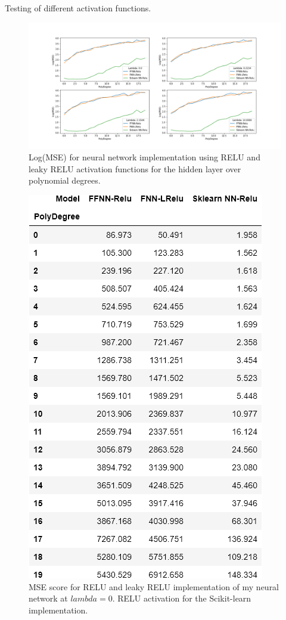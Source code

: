 \documentclass[reprint,english,notitlepage]{revtex4-2}  %
\begin{document}
Testing of different activation functions.
\begin{figure}[!htb]
	\includegraphics[trim=75 70 0 0, scale=0.25]{Partc-1}
	\caption{Log(MSE) for neural network implementation using RELU and leaky RELU activation functions for the hidden layer over polynomial degrees.   }\label{figure}
	
\end{figure}
\begin{figure}[!htb]
	\includegraphics[trim=75 0 0 0, scale=0.4]{Partc-2}
	\caption{MSE score for RELU and leaky RELU implementation of my neural network at $lambda=0$. RELU activation for the Scikit-learn  implementation.    }\label{figure}
	
\end{figure}
\end{document}
